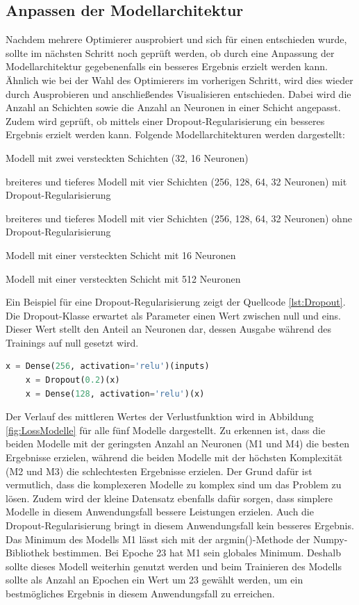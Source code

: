\subsection{Anpassen der Modellarchitektur}
Nachdem mehrere Optimierer ausprobiert und sich für einen entschieden wurde, sollte im nächsten Schritt noch geprüft werden, ob durch eine Anpassung der Modellarchitektur
gegebenenfalls ein besseres Ergebnis erzielt werden kann. Ähnlich wie bei der Wahl des Optimierers im vorherigen Schritt, wird dies wieder durch Ausprobieren und 
anschließendes Visualisieren entschieden. Dabei wird die Anzahl an Schichten sowie die Anzahl an Neuronen in einer Schicht angepasst.
Zudem wird geprüft, ob mittels einer Dropout-Regularisierung ein besseres Ergebnis erzielt werden kann. 
Folgende Modellarchitekturen werden dargestellt:
\\
\begin{description}[style=multiline,leftmargin=3cm,font=\bfseries, nolistsep]
    \item[M1] Modell mit zwei versteckten Schichten (32, 16 Neuronen)
    \item[M2] breiteres und tieferes Modell mit vier Schichten (256, 128, 64, 32 Neuronen) mit Dropout-Regularisierung
    \item[M3] breiteres und tieferes Modell mit vier Schichten (256, 128, 64, 32 Neuronen) ohne Dropout-Regularisierung
    \item[M4] Modell mit einer versteckten Schicht mit 16 Neuronen
    \item[M5] Modell mit einer versteckten Schicht mit 512 Neuronen
\end{description}
Ein Beispiel für eine Dropout-Regularisierung zeigt der Quellcode \ref*{lst:Dropout}. Die Dropout-Klasse erwartet als Parameter einen Wert zwischen null und eins. 
Dieser Wert stellt den Anteil an Neuronen dar, dessen Ausgabe während des Trainings auf null gesetzt wird.
\begin{lstlisting}[language = python, caption={Dropout-Regularisierung mit Keras},captionpos=b, label = lst:Dropout, floatplacement=H]
    x = Dense(256, activation='relu')(inputs)
    x = Dropout(0.2)(x)
    x = Dense(128, activation='relu')(x)
\end{lstlisting}
Der Verlauf des mittleren Wertes der Verlustfunktion wird in Abbildung \ref*{fig:LossModelle} für alle fünf Modelle dargestellt. Zu erkennen ist, dass die beiden Modelle mit 
der geringsten Anzahl an Neuronen (M1 und M4) die besten Ergebnisse erzielen, während die beiden Modelle mit der höchsten Komplexität (M2 und M3) die schlechtesten Ergebnisse
erzielen. Der Grund dafür ist vermutlich, dass die komplexeren Modelle zu komplex sind um das Problem zu lösen. Zudem wird der kleine Datensatz ebenfalls dafür sorgen,
dass simplere Modelle in diesem Anwendungsfall bessere Leistungen erzielen. Auch die Dropout-Regularisierung bringt in diesem Anwendungsfall kein besseres Ergebnis. Das Minimum
des Modells M1 lässt sich mit der argmin()-Methode der Numpy-Bibliothek bestimmen. Bei Epoche 23 hat M1 sein globales Minimum. Deshalb sollte dieses Modell weiterhin genutzt werden
und beim Trainieren des Modells sollte als Anzahl an Epochen ein Wert um 23 gewählt werden, um ein bestmögliches Ergebnis in diesem Anwendungsfall zu erreichen.

